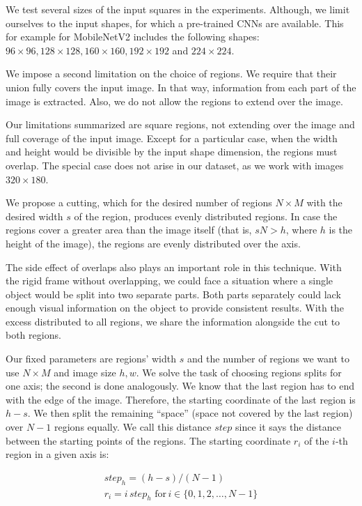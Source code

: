 We test several sizes of the input squares in the experiments. Although, we limit ourselves to the input shapes, for which a pre-trained CNNs are available. This for example for MobileNetV2 includes the following shapes: $96 \times 96, 128 \times 128, 160 \times 160, 192 \times 192$ and $224 \times 224$.

We impose a second limitation on the choice of regions. We require that their union fully covers the input image. In that way, information from each part of the image is extracted. Also, we do not allow the regions to extend over the image. 

Our limitations summarized are square regions, not extending over the image and full coverage of the input image. Except for a particular case, when the width and height would be divisible by the input shape dimension, the regions must overlap. The special case does not arise in our dataset, as we work with images $320 \times 180$.

We propose a cutting, which for the desired number of regions $N \times M$ with the desired width $s$ of the region, produces evenly distributed regions. In case the regions cover a greater area than the image itself (that is, $sN > h$, where $h$ is the height of the image), the regions are evenly distributed over the axis.

The side effect of overlaps also plays an important role in this technique. With the rigid frame without overlapping, we could face a situation where a single object would be split into two separate parts. Both parts separately could lack enough visual information on the object to provide consistent results. With the excess distributed to all regions, we share the information alongside the cut to both regions.

Our fixed parameters are regions' width $s$ and the number of regions we want to use $N \times M$ and image size $h, w$. We solve the task of choosing regions splits for one axis; the second is done analogously. We know that the last region has to end with the edge of the image. Therefore, the starting coordinate of the last region is $h - s$. We then split the remaining ``space'' (space not covered by the last region) over $N-1$ regions equally. We call this distance $step$ since it says the distance between the starting points of the regions. The starting coordinate $r_i$ of the $i$-th region in a given axis is:

\begin{align*}
step_h = (h - s) / (N - 1) \\
r_i = {i \, step_h\,\,\text{for}\,i \in \{0, 1, 2, \dots, N - 1\}}
\end{align*}

